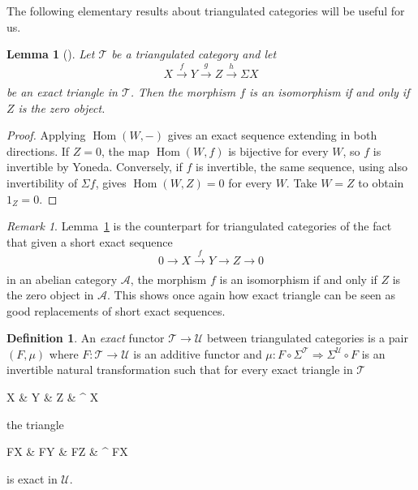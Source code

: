 \documentclass[11pt,reqno,a4paper]{amsart}
\newtheorem{lemma}[theorem]{Lemma}
\theoremstyle{definition}
\newtheorem{definition}[theorem]{Definition}
\theoremstyle{remark}
\newtheorem{remark}[theorem]{Remark}
\def\nameit#1{\textrm{#1}~}
\def\lemx{\nameit{Lemma}}
\def\dfn#1{{\itshape #1}}
\newcommand{\T}{\mathcal{T}}
\newcommand{\U}{\mathcal{U}}
\newcommand{\0}{\mathbf{0}}
\renewcommand{\1}{\mathbf{1}}
\def\:{\colon}
\def\c{\circ}
\newcommand{\aar}[2][]{\xrightarrow[#1]{#2}}
\begin{document}
The following elementary results about triangulated categories will be useful for us.

\begin{lemma}[\cite{GelfandManin}]\label{lemmaisozero}
   Let $\T$ be a triangulated category and let
   $$X \aar{f} Y \aar{g} Z \aar{h} \Sigma X$$
   be an exact triangle in $\T$. Then the morphism $f$ is an isomorphism if and only if $Z$ is the zero object.
\end{lemma}
\begin{proof}
Applying $\operatorname{Hom}(W,-)$ gives an exact sequence extending in both directions. If $Z=0$, the map $\operatorname{Hom}(W,f)$ is bijective for every $W$, so $f$ is invertible by Yoneda. Conversely, if $f$ is invertible, the same sequence, using also invertibility of $\Sigma f$, gives $\operatorname{Hom}(W,Z)=0$ for every $W$. Take $W=Z$ to obtain $1_Z=0$.
\end{proof}

\begin{remark}
    \lemx \ref{lemmaisozero} is the counterpart for triangulated categories of the fact that given a short exact sequence
    $$0\aar{} X\aar{f} Y \aar{} Z \aar{} 0$$
    in an abelian category $\mathcal{A}$, the morphism $f$ is an isomorphism if and only if $Z$ is the zero object in $\mathcal{A}$. This shows once again how exact triangle can be seen as good replacements of short exact sequences.
\end{remark}

\begin{definition}
    An \dfn{exact} functor $\T \to \U$ between triangulated categories is a pair $(F,\mu)$ where $F\: \T \to \U$ is an additive functor and $\mu\: F \c \Sigma^{\T} \Rightarrow \Sigma^{\U} \c F$ is an invertible natural transformation such that for every exact triangle in $\T$
\vspace{-1.5mm}
\begin{cd}
X \arrow[r, "u"] \& Y \arrow[r, "v"]  \& Z  \arrow[r, "w"] \&  \Sigma^{\T} X
\vspace{-2.5mm}
\end{cd}
the triangle
\vspace{-1.5mm}
\begin{cd}
FX \arrow[r, "Fu"] \& FY \arrow[r, "Fv"]  \& FZ  \arrow[r, "\mu_X \c Fw"] \&  {\Sigma ^{\U} FX}
\vspace{-1.5mm}
\end{cd}
is exact in $\U$.
\end{definition}
\end{document}
